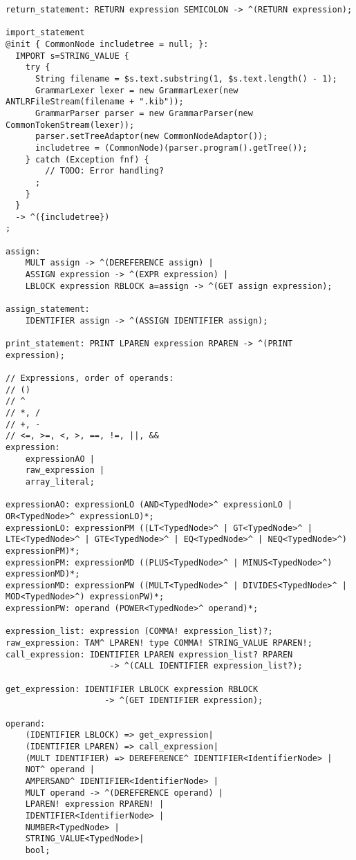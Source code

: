 \begin{landscape}
\begin{lstlisting}
return_statement: RETURN expression SEMICOLON -> ^(RETURN expression);

import_statement
@init { CommonNode includetree = null; }:
  IMPORT s=STRING_VALUE {
    try {
      String filename = $s.text.substring(1, $s.text.length() - 1);
      GrammarLexer lexer = new GrammarLexer(new ANTLRFileStream(filename + ".kib"));
      GrammarParser parser = new GrammarParser(new CommonTokenStream(lexer));
      parser.setTreeAdaptor(new CommonNodeAdaptor());
      includetree = (CommonNode)(parser.program().getTree());
    } catch (Exception fnf) {
        // TODO: Error handling?
      ;
    }
  }
  -> ^({includetree})
;

assign:
    MULT assign -> ^(DEREFERENCE assign) |
    ASSIGN expression -> ^(EXPR expression) |
    LBLOCK expression RBLOCK a=assign -> ^(GET assign expression);

assign_statement: 
    IDENTIFIER assign -> ^(ASSIGN IDENTIFIER assign);

print_statement: PRINT LPAREN expression RPAREN -> ^(PRINT expression);

// Expressions, order of operands:
// ()
// ^
// *, /
// +, -
// <=, >=, <, >, ==, !=, ||, &&
expression:
    expressionAO |
    raw_expression |
    array_literal;

expressionAO: expressionLO (AND<TypedNode>^ expressionLO | OR<TypedNode>^ expressionLO)*;
expressionLO: expressionPM ((LT<TypedNode>^ | GT<TypedNode>^ | LTE<TypedNode>^ | GTE<TypedNode>^ | EQ<TypedNode>^ | NEQ<TypedNode>^) expressionPM)*;
expressionPM: expressionMD ((PLUS<TypedNode>^ | MINUS<TypedNode>^) expressionMD)*;
expressionMD: expressionPW ((MULT<TypedNode>^ | DIVIDES<TypedNode>^ | MOD<TypedNode>^) expressionPW)*;
expressionPW: operand (POWER<TypedNode>^ operand)*;

expression_list: expression (COMMA! expression_list)?;
raw_expression: TAM^ LPAREN! type COMMA! STRING_VALUE RPAREN!;
call_expression: IDENTIFIER LPAREN expression_list? RPAREN
                     -> ^(CALL IDENTIFIER expression_list?);

get_expression: IDENTIFIER LBLOCK expression RBLOCK
                    -> ^(GET IDENTIFIER expression);

operand:
    (IDENTIFIER LBLOCK) => get_expression|
    (IDENTIFIER LPAREN) => call_expression|
    (MULT IDENTIFIER) => DEREFERENCE^ IDENTIFIER<IdentifierNode> |
    NOT^ operand |
    AMPERSAND^ IDENTIFIER<IdentifierNode> |
    MULT operand -> ^(DEREFERENCE operand) |
    LPAREN! expression RPAREN! |
    IDENTIFIER<IdentifierNode> |
    NUMBER<TypedNode> |
    STRING_VALUE<TypedNode>|
    bool;


\end{lstlisting}
\end{landscape}

